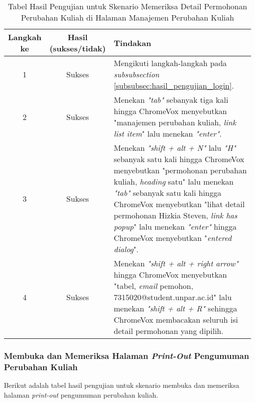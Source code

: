 \begin{table}[H]
    \centering 
    \caption{Tabel Hasil Pengujian untuk Skenario Memeriksa Detail Permohonan Perubahan Kuliah di Halaman Manajemen Perubahan Kuliah}
    \label{tab:hasil_pengujian_memeriksa_detail_permohonan_perubahan_kuliah_di_halaman_manajemen_perubahan_kuliah}
    \begin{tabular}{|c|c|p{10cm}|}
        \toprule
        Langkah ke & Hasil (sukses/tidak) & Tindakan \\

        \midrule
        1 & Sukses & Mengikuti langkah-langkah pada \textit{subsubsection} \ref{subsubsec:hasil_pengujian_login}. \\
        2 & Sukses & Menekan \textit{"tab"} sebanyak tiga kali hingga ChromeVox menyebutkan "manajemen perubahan kuliah, \textit{link list item}" lalu menekan \textit{"enter"}. \\
        3 & Sukses & Menekan \textit{"shift + alt + N"} lalu \textit{"H"} sebanyak satu kali hingga ChromeVox menyebutkan "permohonan perubahan kuliah, \textit{heading} satu" lalu menekan \textit{"tab"} sebanyak satu kali hingga ChromeVox menyebutkan "lihat detail permohonan Hizkia Steven, \textit{link has popup}" lalu menekan \textit{"enter"} hingga ChromeVox menyebutkan "\textit{entered dialog}". \\
        4 & Sukses & Menekan \textit{"shift + alt + right arrow"} hingga ChromeVox menyebutkan "tabel, \textit{email} pemohon, 7315020@student.unpar.ac.id" lalu menekan \textit{"shift + alt + R"} sehingga ChromeVox membacakan seluruh isi detail permohonan yang dipilih. \\

        \bottomrule

    \end{tabular}
\end{table}

\subsubsection{Membuka dan Memeriksa Halaman \textit{Print-Out} Pengumuman Perubahan Kuliah}
\label{subsubsec:hasil_pengujian_membuka_dan_memeriksa_halaman_print_out_pengumuman_perubahan_kuliah}
Berikut adalah tabel hasil pengujian untuk skenario membuka dan memeriksa halaman \textit{print-out} pengumuman perubahan kuliah.

